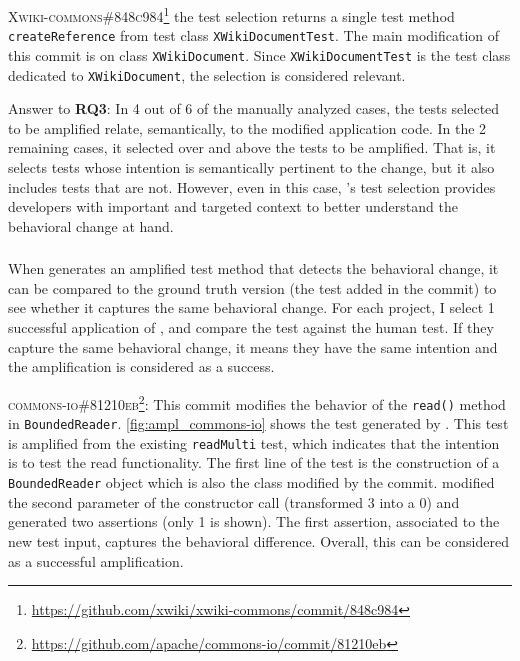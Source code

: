 \textsc{Xwiki-commons\#848c984}\footnote{\url{https://github.com/xwiki/xwiki-commons/commit/848c984}} the test selection returns a single test method \texttt{createReference} from test class \texttt{XWikiDocumentTest}.
The main modification of this commit is on class \texttt{XWikiDocument}.
Since \texttt{XWikiDocumentTest} is the test class dedicated to \texttt{XWikiDocument}, the selection is considered relevant.

\begin{mdframed}
Answer to \textbf{RQ3}: 
In 4 out of 6 of the manually analyzed cases, the tests selected to be amplified relate, semantically, to the modified application code. 
In the 2 remaining cases, it selected over and above the tests to be amplified.
That is, it selects tests whose intention is semantically pertinent to the change, but it also includes tests that are not.
However, even in this case, \DCI's test selection provides developers with important and targeted context to better understand the behavioral change at hand.
\end{mdframed}


\subsubsection{\rqhuman}
\label{subsubsec:dci:evaluation:rq4}

When \DCI generates an amplified test method that detects the behavioral change, it can be compared to the ground truth version (the test added in the commit) to see whether it captures the same behavioral change.
For each project, I select 1 successful application of \DCI, and compare the \DCI test against the human test.
If they capture the same behavioral change, it means they have the same intention and the amplification is considered as a success.


\textsc{commons-io\#81210eb}\footnote{\url{https://github.com/apache/commons-io/commit/81210eb}}: This commit modifies the behavior of the \texttt{read()} method in \texttt{BoundedReader}.
\autoref{fig:ampl_commons-io} shows the test generated by \DCII.
This test is amplified from the existing \texttt{readMulti} test, which indicates that the intention is to test the read functionality.
The first line of the test is the construction of a \texttt{BoundedReader} object which is also the class modified by the commit.
\DCII modified the second parameter of the constructor call (transformed $3$ into a $0$) and generated two assertions (only 1 is shown).
The first assertion, associated to the new test input, captures the behavioral difference.
Overall, this can be considered as a successful amplification.

